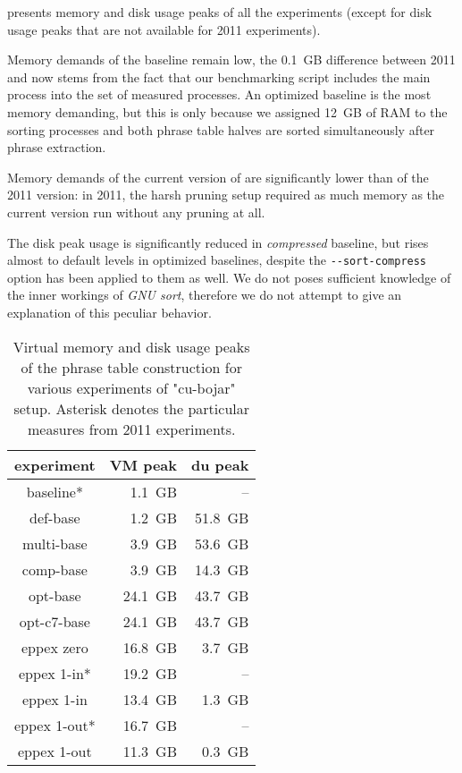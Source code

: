  presents memory and disk usage peaks of all the experiments
(except for disk usage peaks that are not available for 2011 experiments).

Memory demands of the baseline remain low, the 0.1~GB difference between 2011 and now
stems from the fact that our benchmarking script includes the main process into the set of
measured processes.
An optimized baseline is the most memory demanding, but this is only because we assigned 12~GB
of RAM to the sorting processes and both phrase table halves are sorted simultaneously after
phrase extraction.

Memory demands of the current version of \eppex{} are significantly lower than of the 2011 version:
in 2011, the harsh pruning setup required as much memory as the current version run without
any pruning at all.

The disk peak usage is significantly reduced in \emph{compressed} baseline, but rises almost to
default levels in optimized baselines, despite the \verb|--sort-compress| option has been applied
to them as well.
We do not poses sufficient knowledge of the inner workings of \emph{GNU sort}, therefore we do not
attempt to give an explanation of this peculiar behavior.

\begin{table}[ht]
\centering
\begin{tabular}{ | c | r | r | }
\hline
experiment & VM peak & du peak \\
\hline
\hline
baseline*     &  1.1~GB &      -- \\
def-base      &  1.2~GB & 51.8~GB \\
multi-base    &  3.9~GB & 53.6~GB \\
comp-base     &  3.9~GB & 14.3~GB \\
opt-base      & 24.1~GB & 43.7~GB \\
opt-c7-base   & 24.1~GB & 43.7~GB \\
eppex zero    & 16.8~GB &  3.7~GB \\
\hline
eppex 1-in*   & 19.2~GB &      -- \\
eppex 1-in    & 13.4~GB &  1.3~GB \\
\hline
eppex 1-out*  & 16.7~GB &      -- \\
eppex 1-out   & 11.3~GB &  0.3~GB \\
\hline
\end{tabular}
\caption{\label{cu-bojar-vm-and-du-peaks}
Virtual memory and disk usage peaks of the phrase table construction for various experiments
of "cu-bojar" setup. Asterisk denotes the particular measures from 2011 experiments.}
\end{table}

